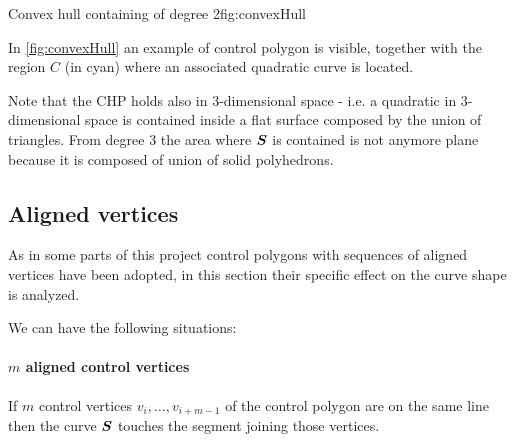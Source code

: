 \documentclass[dissertation.tex]{subfiles}
\begin{document}
\begin{myfig}{Convex hull containing \bs of degree 2}{fig:convexHull}
\end{myfig}
In \cref{fig:convexHull} an example of control polygon is visible,
together with the region $C$ (in cyan) where an associated quadratic
\bs curve is located.

Note that the \ac{CHP} holds also in
3-dimensional
space - i.e. a quadratic \bs in 3-dimensional space is contained
inside a flat surface composed by the union of triangles. From degree 3
the area where $\boldsymbol{S}$ is contained is not anymore plane
because it is composed of union of solid polyhedrons.

\subsection{Aligned vertices}\label{sec:alignedVertices}
As in some parts of this project control polygons with sequences of
aligned vertices have been adopted, in this section their specific
effect on the curve shape is analyzed. 

We can have the following situations:
\paragraph{$m$ aligned control vertices}
If $m$ control vertices $v_i,\dots,v_{i+m-1}$ of the control polygon
are on the same line then
the curve $\boldsymbol{S}$ touches the segment joining those vertices.
\end{document}
